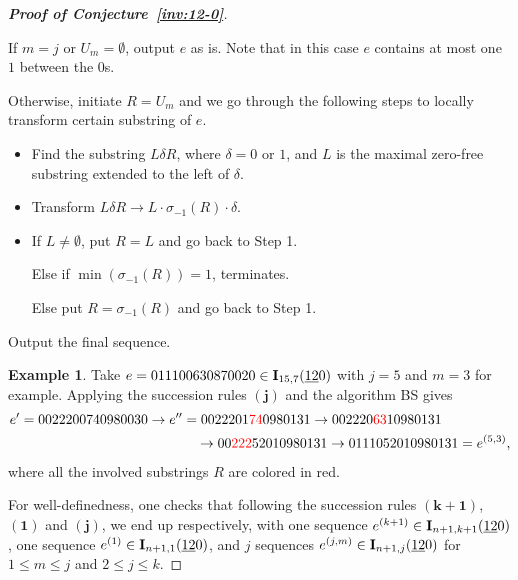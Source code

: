 \documentclass[12pt,A4]{amsart}
\numberwithin{equation}{section}
\def\red{\textcolor{red}}
\theoremstyle{plain}
\theoremstyle{definition}
\newtheorem{example}[theorem]{Example}
\def\I{\operatorname{{\bf I}}}
\begin{document}
\begin{proof}[{\bf Proof of Conjecture~\ref{inv:12-0}}]
\begin{framed}
If $m=j$ or $U_m=\emptyset$, output $e$ as is. Note that in this case $e$ contains at most one $1$ between the $0$s.

Otherwise, initiate $R=U_m$ and we go through the following steps to locally transform certain substring of $e$. 
\begin{itemize}
	\item[Step 1] Find the substring $L\delta R$, where $\delta=0$ or $1$, and $L$ is the maximal zero-free substring extended to the left of $\delta$.
	\item[Step 2] Transform $L\delta R\rightarrow L\cdot\sigma_{-1}(R)\cdot\delta$. 
    \item[Step 3] If $L\neq\emptyset$, put $R=L$ and go back to Step 1.
 
    Else if $\min(\sigma_{-1}(R))=1$, terminates.

    \quad Else put $R=\sigma_{-1}(R)$ and go back to Step 1.
\end{itemize}
\noindent Output the final sequence.

\begin{example} Take $e=011100630870020\in\I_{15,7}(\underline{12}0)$ with $j=5$ and $m=3$ for example. Applying the succession rules $\mathbf{(j)}$ and the algorithm BS gives
\begin{align*}
e'=0022200740980030\rightarrow e''&=0022201\red{74}0980131\rightarrow 002220\red{63}10980131\\
&\quad\rightarrow 00\red{222}52010980131\rightarrow 0111052010980131=e^{(5,3)},
\end{align*}
where all the involved substrings $R$ are colored in red.
\end{example}
\end{framed}
For well-definedness, one checks that following the succession rules $\mathbf{(k+1)}$, $\mathbf{(1)}$ and $\mathbf{(j)}$, we end up respectively, with one sequence $e^{(k+1)}\in\I_{n+1,k+1}(\underline{12}0)$, one sequence $e^{(1)}\in\I_{n+1,1}(\underline{12}0)$, and $j$ sequences $e^{(j,m)}\in\I_{n+1,j}(\underline{12}0)$ for $1\le m\le j$ and $2\le j\le k$.


\end{proof}
\end{document}
